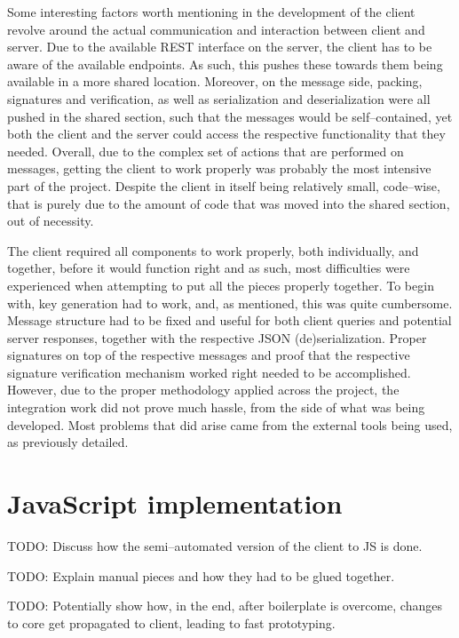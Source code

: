 Some interesting factors worth mentioning in the development of the client revolve around the actual communication and interaction between client and server.
Due to the available REST interface on the server, the client has to be aware of the available endpoints.
As such, this pushes these towards them being available in a more shared location.
Moreover, on the message side, packing, signatures and verification, as well as serialization and deserialization were all pushed in the shared section, such that the messages would be self--contained, yet both the client and the server could access the respective functionality that they needed.
Overall, due to the complex set of actions that are performed on messages, getting the client to work properly was probably the most intensive part of the project.
Despite the client in itself being relatively small, code--wise, that is purely due to the amount of code that was moved into the shared section, out of necessity.

The client required all components to work properly, both individually, and together, before it would function right and as such, most difficulties were experienced when attempting to put all the pieces properly together.
To begin with,  key generation had to work, and, as mentioned, this was quite cumbersome.
Message structure had to be fixed and useful for both client queries and potential server responses, together with the respective JSON (de)serialization.
Proper  signatures on top of the respective messages and proof that the respective  signature verification mechanism worked right needed to be accomplished.
However, due to the proper methodology applied across the project, the integration work did not prove much hassle, from the side of what was being developed.
Most problems that did arise came from the external tools being used, as previously detailed.

\section{JavaScript implementation}
TODO: Discuss how the semi--automated version of the client to JS is done.

TODO: Explain manual pieces and how they had to be glued together.

TODO: Potentially show how, in the end, after boilerplate is overcome, changes to core get propagated to client, leading to fast prototyping.
